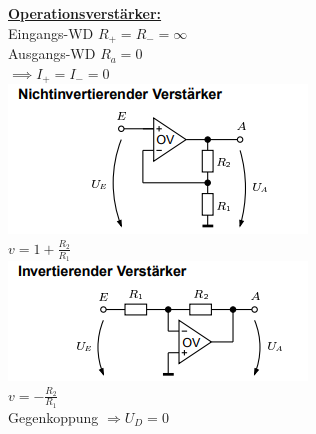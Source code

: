 \documentclass[8pt]{extarticle}
\begin{document}
\begin{minipage}{0.33\textwidth}
\underline{\textbf{Operationsverstärker:}}\\
Eingangs-WD $R_+ = R_- = \infty$ \\
Ausgangs-WD $R_a = 0$ \\
$\implies I_+ = I_- = 0$ \\

\includegraphics[scale=0.40]{NIOV.png}\\
$v=1+\frac{R_2}{R_1}$\\
\includegraphics[scale=0.40]{IOV.png} \\
$v=-\frac{R_2}{R_1}$\\
Gegenkoppung $\Rightarrow U_D = 0$\\


\end{minipage}
\end{document}
